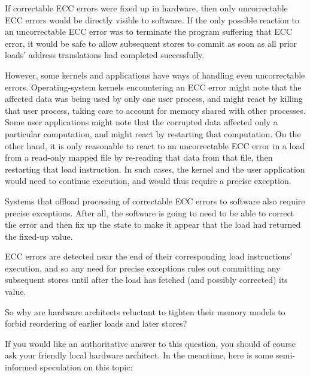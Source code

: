 \documentclass[10]{article}
\begin{document}
If correctable ECC errors were fixed up in hardware, then only uncorrectable
ECC errors would be directly visible to software.
If the only possible reaction to an uncorrectable ECC error was to
terminate the program suffering that ECC error, it would be safe to
allow subsequent stores to commit as soon as all prior loads' address
translations had completed successfully.

However, some kernels and applications have ways of handling even
uncorrectable errors.
Operating-system kernels encountering an ECC error might note that the
affected data was being used by only one user process, and might react by
killing that user process, taking care to account for memory shared with
other processes.
Some user applications might note that the corrupted data affected only
a particular computation, and might react by restarting that computation.
On the other hand, it is only reasonable to react to an uncorrectable ECC
error in a load from a read-only mapped file by re-reading that data
from that file, then restarting that load instruction.
In such cases, the kernel and the user application would need to continue
execution, and would thus require a precise exception.

Systems that offload processing of correctable ECC errors to software
also require precise exceptions.
After all, the software is going to need to be able to correct the error
and then fix up the state to make it appear that the load had returned
the fixed-up value.

ECC errors are detected near the end of their corresponding load
instructions' execution, and so any need for precise exceptions rules out
committing any subsequent stores until after the load has fetched
(and possibly corrected) its value.

So why are hardware architects reluctant to tighten their memory models
to forbid reordering of earlier loads and later stores?

If you would like an authoritative answer to this question, you should of
course ask your friendly local hardware architect.
In the meantime, here is some semi-informed speculation on this topic:
\end{document}
